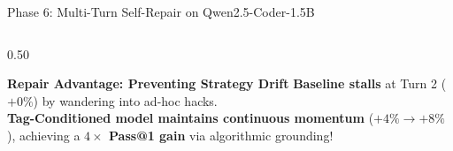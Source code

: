 \documentclass[aspectratio=169,10pt]{beamer}
\begin{document}
\begin{frame}{Phase 6: Multi-Turn Self-Repair on Qwen2.5-Coder-1.5B}
\begin{columns}[T]
    \begin{column}{0.50\textwidth}
      \begin{table}[h]
        \centering
        \tiny
        \caption{Multi-Turn Repair Trajectory on 1.5B ($N=25$ Problems)}
      \end{table}
      \vspace{-3pt}
      \begin{exampleblock}{\textbf{Repair Advantage: Preventing Strategy Drift}}
        \scriptsize
        \textbf{Baseline stalls} at Turn 2 ($+0\%$) by wandering into ad-hoc hacks. \\
        \textbf{Tag-Conditioned model maintains continuous momentum} ($+4\% \to +8\%$), achieving a \textbf{$4\times$ Pass@1 gain} via algorithmic grounding!
      \end{exampleblock}
    \end{column}
  \end{columns}
\end{frame}
\end{document}
